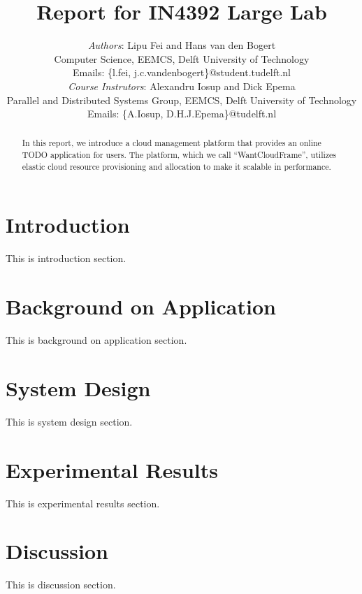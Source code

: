 \documentclass[10pt, a4paper, twoside, twocolumn, technote]{IEEEtran}
\begin{document}
\title{Report for IN4392 Large Lab}
\author{\textit{Authors}: Lipu Fei and Hans van den Bogert\\
Computer Science, EEMCS, Delft University of Technology\\
Emails: \{l.fei, j.c.vandenbogert\}@student.tudelft.nl\\
\textit{Course Instrutors}: Alexandru Iosup and Dick Epema\\
Parallel and Distributed Systems Group, EEMCS, Delft University of Technology\\
Emails: \{A.Iosup, D.H.J.Epema\}@tudelft.nl}


\maketitle


\begin{abstract}
In this report, we introduce a cloud management platform that provides an online TODO application for users. The platform, which we call ``WantCloudFrame'', utilizes elastic cloud resource provisioning and allocation to make it scalable in performance.
\end{abstract}

\section{Introduction}
This is introduction section.

\section{Background on Application}
This is background on application section.

\section{System Design}
This is system design section.

\section{Experimental Results}
This is experimental results section.

\section{Discussion}
This is discussion section.
\end{document}
